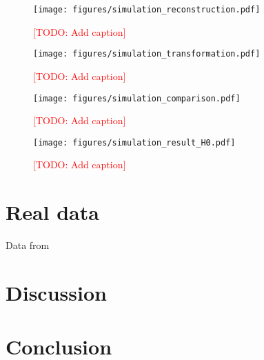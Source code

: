 \documentclass[aps,prd,twocolumn,superscriptaddress,preprintnumbers,nofootinbib,hidelinks]{revtex4-2}
\newcommand{\todo}[1]{\textcolor{red}{[TODO: #1]}}
\begin{document}
\begin{figure}[h]
    \texttt{[image: figures/simulation\_reconstruction.pdf]}
    \caption{
        \todo{Add caption}
    }
    \label{fig:simulation_reconstruction}
\end{figure}

\begin{figure}[h]
    \texttt{[image: figures/simulation\_transformation.pdf]}
    \caption{
        \todo{Add caption}
    }
    \label{fig:simulation_transformation}
\end{figure}

\begin{figure}[h]
    \texttt{[image: figures/simulation\_comparison.pdf]}
    \caption{
        \todo{Add caption}
    }
    \label{fig:simulation_comparison}
\end{figure}

\begin{figure}[h]
    \texttt{[image: figures/simulation\_result\_H0.pdf]}
    \caption{
        \todo{Add caption}
    }
    \label{fig:simulation_result_H0}
\end{figure}


\section{Real data}
\label{sec:real_data}

Data from \citet{LIGOScientific:2019lzm, KAGRA:2023pio}


\section{Discussion}
\label{sec:discussion}




\section{Conclusion}
\label{sec:conclusion}
\end{document}
